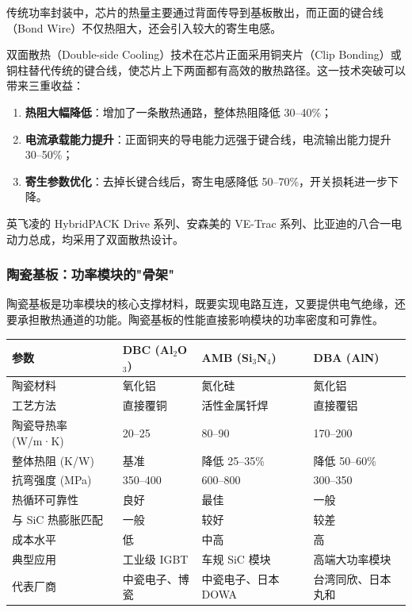 传统功率封装中，芯片的热量主要通过背面传导到基板散出，而正面的键合线（Bond Wire）不仅热阻大，还会引入较大的寄生电感。

双面散热（Double-side Cooling）技术在芯片正面采用铜夹片（Clip Bonding）或铜柱替代传统的键合线，使芯片上下两面都有高效的散热路径。这一技术突破可以带来三重收益：

\begin{enumerate}[leftmargin=2em]
\item \textbf{热阻大幅降低}：增加了一条散热通路，整体热阻降低 30–40\%；
\item \textbf{电流承载能力提升}：正面铜夹的导电能力远强于键合线，电流输出能力提升 30–50\%；
\item \textbf{寄生参数优化}：去掉长键合线后，寄生电感降低 50–70\%，开关损耗进一步下降。
\end{enumerate}

英飞凌的 HybridPACK Drive 系列、安森美的 VE-Trac 系列、比亚迪的八合一电动力总成，均采用了双面散热设计。

\subsubsection{陶瓷基板：功率模块的"骨架"}

陶瓷基板是功率模块的核心支撑材料，既要实现电路互连，又要提供电气绝缘，还要承担散热通道的功能。陶瓷基板的性能直接影响模块的功率密度和可靠性。

\begin{exhibitbox}[表 4-7：三种陶瓷基板技术对比]
\centering
\small
\setlength{\tabcolsep}{4pt}
\begin{tabularx}{\textwidth}{X C{2.8cm} C{2.8cm} C{2.8cm}}
\toprule
\textbf{参数} & \textbf{DBC (Al$_2$O$_3$)} & \textbf{AMB (Si$_3$N$_4$)} & \textbf{DBA (AlN)} \\
\midrule
陶瓷材料 & 氧化铝 & 氮化硅 & 氮化铝 \\
工艺方法 & 直接覆铜 & 活性金属钎焊 & 直接覆铝 \\
陶瓷导热率 (W/m·K) & 20–25 & 80–90 & 170–200 \\
整体热阻 (K/W) & 基准 & 降低 25–35\% & 降低 50–60\% \\
\midrule
抗弯强度 (MPa) & 350–400 & 600–800 & 300–350 \\
热循环可靠性 & 良好 & 最佳 & 一般 \\
与 SiC 热膨胀匹配 & 一般 & 较好 & 较差 \\
\midrule
成本水平 & 低 & 中高 & 高 \\
典型应用 & 工业级 IGBT & 车规 SiC 模块 & 高端大功率模块 \\
代表厂商 & 中瓷电子、博瓷 & 中瓷电子、日本 DOWA & 台湾同欣、日本丸和 \\
\bottomrule
\end{tabularx}
\end{exhibitbox}

